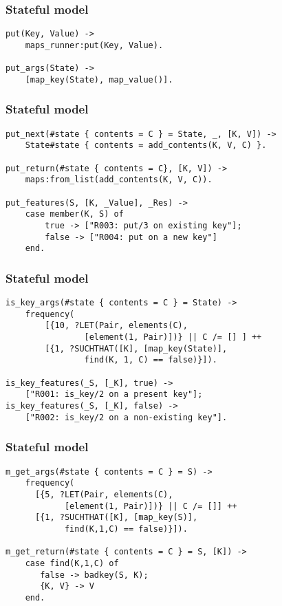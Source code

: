 \documentclass[lualatex]{beamer}
\begin{document}
\begin{frame}[fragile]
\frametitle{Stateful model}

\begin{verbatim}
put(Key, Value) ->
    maps_runner:put(Key, Value).
    
put_args(State) ->
    [map_key(State), map_value()].
\end{verbatim}
\end{frame}

\begin{frame}[fragile]
\frametitle{Stateful model}
\begin{Verbatim}[fontsize=\small]
put_next(#state { contents = C } = State, _, [K, V]) ->
    State#state { contents = add_contents(K, V, C) }.

put_return(#state { contents = C}, [K, V]) ->
    maps:from_list(add_contents(K, V, C)).

put_features(S, [K, _Value], _Res) ->
    case member(K, S) of
        true -> ["R003: put/3 on existing key"];
        false -> ["R004: put on a new key"]
    end.
\end{Verbatim}
\end{frame}

\begin{frame}[fragile]
\frametitle{Stateful model}
\begin{Verbatim}[fontsize=\small]
is_key_args(#state { contents = C } = State) ->
    frequency(
        [{10, ?LET(Pair, elements(C),
        		[element(1, Pair)])} || C /= [] ] ++
        [{1, ?SUCHTHAT([K], [map_key(State)],
        		find(K, 1, C) == false)}]).

is_key_features(_S, [_K], true) ->
	["R001: is_key/2 on a present key"];
is_key_features(_S, [_K], false) ->
	["R002: is_key/2 on a non-existing key"].
\end{Verbatim}
\end{frame}

\begin{frame}[fragile]
\frametitle{Stateful model}
\begin{Verbatim}[fontsize=\small]
m_get_args(#state { contents = C } = S) ->
    frequency(
      [{5, ?LET(Pair, elements(C),
      		[element(1, Pair)])} || C /= []] ++
      [{1, ?SUCHTHAT([K], [map_key(S)],
      		find(K,1,C) == false)}]).

m_get_return(#state { contents = C } = S, [K]) ->
    case find(K,1,C) of
       false -> badkey(S, K);
       {K, V} -> V
    end.
\end{Verbatim}
\end{frame}
\end{document}
